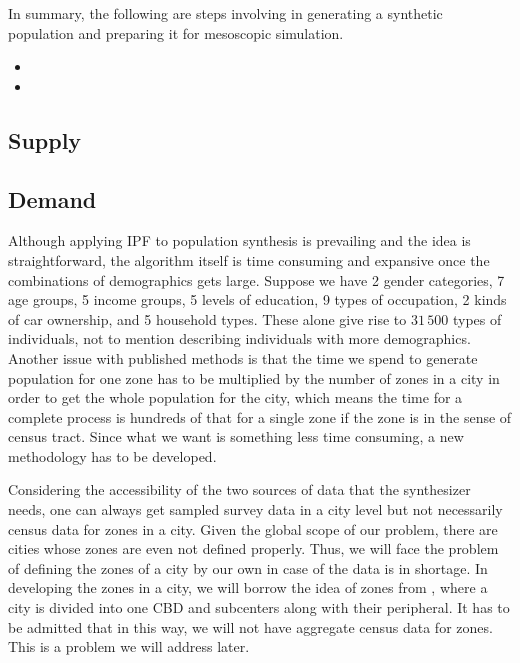 \documentclass[11pt,twoside]{article}
\numberwithin{equation}{section}
\newcommand{\?}{\stackrel{?}{=}}
\begin{document}
In summary, the following are steps involving in generating a synthetic population and preparing it for mesoscopic simulation.
\begin{itemize}
\item 
\item 
\end{itemize}

\subsection{Supply}

\subsection{Demand}


Although applying IPF to population synthesis is prevailing and the idea is straightforward, the algorithm itself is time consuming and expansive once the combinations of demographics gets large.
Suppose we have 2 gender categories, 7 age groups, 5 income groups, 5 levels of education, 9 types of occupation, 2 kinds of car ownership, and 5 household types.
These alone give rise to $31\,500$ types of individuals, not to mention describing individuals with more demographics.
Another issue with published methods is that the time we spend to generate population for one zone has to be multiplied by the number of zones in a city in order to get the whole population for the city, which means the time for a complete process is hundreds of that for a single zone if the zone is in the sense of census tract.
Since what we want is something less time consuming, a new methodology has to be developed.

Considering the accessibility of the two sources of data that the synthesizer needs, one can always get sampled survey data in a city level but not necessarily census data for zones in a city.
Given the global scope of our problem, there are cities whose zones are even not defined properly.
Thus, we will face the problem of defining the zones of a city by our own in case of the data is in shortage.
In developing the zones in a city, we will borrow the idea of zones from \textcite{fielbaum2016parametric}, where a city is divided into one CBD and subcenters along with their peripheral.
It has to be admitted that in this way, we will not have aggregate census data for zones. This is a problem we will address later. 
\end{document}
